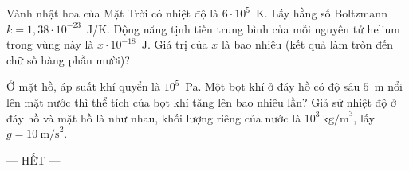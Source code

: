 	\begin{ex}%
		Vành nhật hoa của Mặt Trời có nhiệt độ là $6\cdot 10^5$~K. Lấy hằng số Boltzmann $k=1{,}38\cdot 10^{-23}$~J/K. Động năng tịnh tiến trung bình của mỗi nguyên tử helium trong vùng này là $x\cdot 10^{-18}$~J. Giá trị của $x$ là bao nhiêu (kết quả làm tròn đến chữ số hàng phần mười)?
		\par
	\end{ex}

	\begin{ex}%
		Ở mặt hồ, áp suất khí quyển là $10^5$~Pa. Một bọt khí ở đáy hồ có độ sâu $5$~m nổi lên mặt nước thì thể tích của bọt khí tăng lên bao nhiêu lần? Giả sử nhiệt độ ở đáy hồ và mặt hồ là như nhau, khối lượng riêng của nước là $10^3~\text{kg/m}^3$, lấy $g=10~\text{m/s}^2$.
		\par
	\end{ex}

	\centerline{--- HẾT ---}


